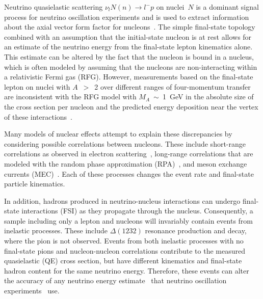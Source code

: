 Neutrino quasielastic scattering $\nu_{l}N(n) \rightarrow l^{-}p$ on nuclei~$N$ 
is a dominant signal process for neutrino oscillation experiments
and is used to extract information about the axial vector form factor for 
nucleons~\cite{Gran:2006jn,AguilarArevalo:2007ab,Espinal:2007zz,Lyubushkin:2008pe,Nakajima:2011zz}.
The simple final-state topology combined with an assumption that the initial-state 
nucleon is at rest allows for an estimate of the neutrino energy 
from the final-state lepton kinematics alone. This estimate can be altered 
by the fact that the nucleon is bound in a nucleus, which is often modeled 
by assuming that the nucleons are non-interacting within a relativistic 
Fermi gas (RFG). However, measurements based on the final-state lepton on nuclei 
with $A$~$>$~2 over different ranges of four-momentum transfer \QSq are inconsistent 
with the RFG model with $M$$_{A}$~$\sim$~1~GeV in the absolute size of the cross section per nucleon 
and the predicted energy deposition near the vertex of these 
interactions~\cite{Gran:2006jn,AguilarArevalo:2007ab,Nakajima:2011zz,AguilarArevalo:2013hm,Fields:2013zhk,Fiorentini:2013ezn}. 

Many models of nuclear effects attempt to explain these discrepancies by considering  
possible correlations between nucleons. These include short-range correlations 
as observed in electron scattering~\cite{Benhar:2006wy,Arrington:2011xs,Arrington:2012ax}, 
long-range correlations that are modeled with the random phase approximation 
(RPA)~\cite{Graczyk:2003ru,Nieves:2004wx,Valverde:2006yi,Martini:2009uj,Martini:2010ex}, 
and meson exchange currents 
(MEC)~\cite{Martini:2009uj,Martini:2010ex,Nieves:2011pp,Bodek:2011ps,Shen:2012xz,Sobczyk:2012ms,Gran:2013kda}.
Each of these processes changes the event rate and final-state particle
kinematics.

In addition, hadrons produced in neutrino-nucleus interactions can undergo final-state 
interactions (FSI) as they propagate through the nucleus. Consequently, 
a sample including only a lepton and nucleons will invariably  
contain events from inelastic processes. These include $\Delta(1232)$ resonance 
production and decay, where the pion is not observed. Events from both 
inelastic processes with no final-state pions and nucleon-nucleon correlations 
contribute to the measured quasielastic (QE) cross section, but have different kinematics and 
final-state hadron content for the same neutrino energy. Therefore, these events 
can alter the accuracy of any neutrino energy 
estimate~\cite{Leitner:2010kp,Martini:2012fa,Martini:2012uc,Nieves:2012yz,Lalakulich:2012gm,Lalakulich:2012hs,Mosel:2013fxa} 
that neutrino oscillation experiments~\cite{LBNE,Jediny:2014lda} use.  

